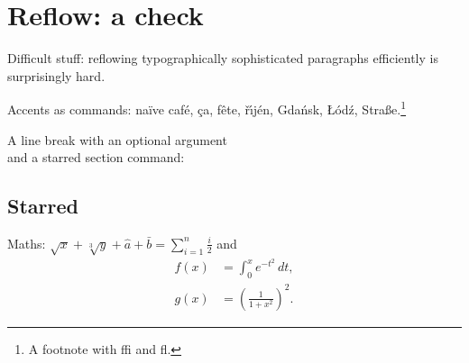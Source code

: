 \documentclass{article}
\begin{document}
\section*{Reflow: a check}
\parbox{9em}{Difficult stuff: reflowing typographically sophisticated paragraphs efficiently is
surprisingly hard.}

Accents as commands: na\"ive caf\'e, \c{c}a, f\^ete, \v{r}\'{\i}j\'en, Gda\'nsk, \L{}\'od\'z, Stra\ss e.\footnote{A footnote with ffi and fl.}

A line break with an optional argument\\[2pt]
and a starred section command:
\subsection*{Starred}

Maths: $\sqrt{x} + \sqrt[3]{y} + \hat{a} + \bar{b} = \sum_{i=1}^{n} \frac{i}{2}$ and
\begin{align}
  f(x) &= \int_0^x e^{-t^2} \, dt, \\
  g(x) &= \left( \frac{1}{1 + x^2} \right)^{\!2}.
\end{align}
\end{document}
